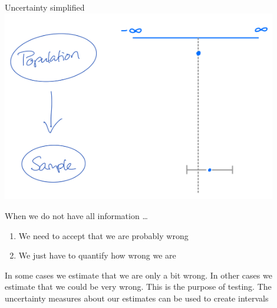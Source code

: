 \documentclass[
  ignorenonframetext,
]{beamer}
\providecommand{\tightlist}{%
  \setlength{\itemsep}{0pt}\setlength{\parskip}{0pt}}\usepackage{longtable,booktabs,array}
\begin{document}
\begin{frame}{Uncertainty simplified}
\protect\hypertarget{uncertainty-simplified}{}
\includegraphics[width=0.9\textwidth,height=\textheight]{img/6. Sample_uncertainty.png}

When we do not have all information \ldots{}

\begin{enumerate}
\tightlist
\item
  We need to accept that we are probably wrong
\item
  We just have to quantify how wrong we are
\end{enumerate}

In some cases we estimate that we are only a bit wrong. In other cases
we estimate that we could be very wrong. This is the purpose of testing.
The uncertainty measures about our estimates can be used to create
intervals
\end{frame}
\end{document}
